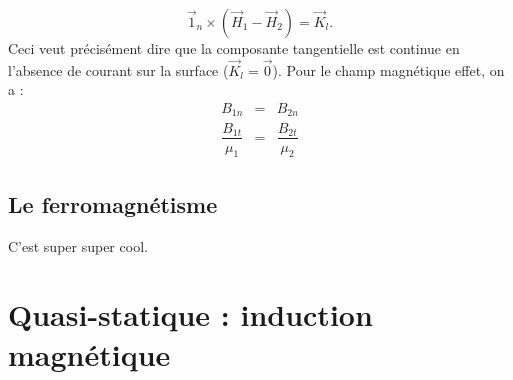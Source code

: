 \documentclass[12pt]{book}
\begin{document}
$$\vec{1}_n \times (\vec{H}_1 - \vec{H}_2) = \vec{K}_l.$$ Ceci veut précisément dire que la composante tangentielle est continue en l'absence de courant sur la surface ($\vec{K}_l = \vec{0}$). Pour le champ magnétique effet, on a :
\begin{eqnarray*}
B_{1n} &=& B_{2n} \\
\dfrac{B_{1t}}{\mu_1} &=& \dfrac{B_{2t}}{\mu_2}
\end{eqnarray*}
\section{Le ferromagnétisme}
C'est super super cool.
\chapter{Quasi-statique : induction magnétique}
\end{document}

